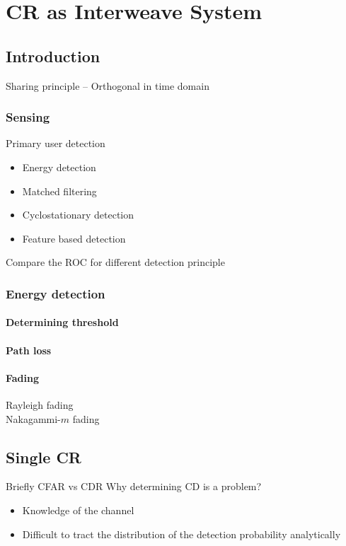 \chapter{CR as Interweave System}
\label{chap:IS}

\section{Introduction}
Sharing principle -- Orthogonal in time domain 

\subsection{Sensing}
Primary user detection \\ 
\begin{itemize}
\item Energy detection
\item Matched filtering
\item Cyclostationary detection
\item Feature based detection
\end{itemize}
Compare the \ac{ROC} for different detection principle 

\subsection{Energy detection}
\subsubsection{Determining threshold} 
\subsubsection{Path loss}
\subsubsection{Fading}
Rayleigh fading \\
Nakagammi-$m$ fading

\section{Single \ac{CR}}
Briefly CFAR vs CDR
Why determining CD is a problem?
\begin{itemize}
\item Knowledge of the channel 
\item Difficult to tract the distribution of the detection probability analytically 
\end{itemize}
